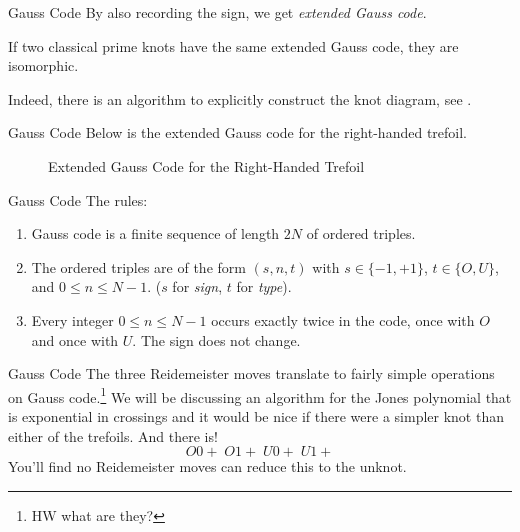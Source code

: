 \documentclass{beamer}
\begin{document}
    \begin{frame}{Gauss Code}
        By also recording the sign, we get \textit{extended Gauss code}.
        \begin{theorem}
            If two classical prime knots have the same extended Gauss code,
            they are isomorphic.
        \end{theorem}
        Indeed, there is an algorithm to explicitly construct the knot diagram,
        see \cite[p.~669]{KauffmanVirtualKnots1999}.
    \end{frame}
    \begin{frame}{Gauss Code}
        Below is the extended Gauss code for the right-handed trefoil.
        \begin{figure}
            \centering
            \caption{Extended Gauss Code for the Right-Handed Trefoil}
            \label{fig:right_hand_trefoil_extended_gauss}
        \end{figure}
    \end{frame}
    \begin{frame}{Gauss Code}
        The rules:
        \begin{enumerate}
            \item Gauss code is a finite sequence of length $2N$ of ordered
                  triples.
            \item The ordered triples are of the form $(s,n,t)$ with
                  $s\in\{-1,+1\}$, $t\in\{O,U\}$, and $0\leq{n}\leq{N-1}$.
                  ($s$ for \textit{sign}, $t$ for \textit{type}).
            \item Every integer $0\leq{n}\leq{N-1}$ occurs exactly twice in the
                  code, once with $O$ and once with $U$. The sign does not
                  change.
        \end{enumerate}
    \end{frame}
    \begin{frame}{Gauss Code}
        The three Reidemeister moves translate to fairly simple operations on
        Gauss code.\footnote{HW what are they?}
        We will be discussing an algorithm for the Jones polynomial that is
        exponential in crossings and it would be nice if there were a simpler
        knot than either of the trefoils. And there is!
        \begin{equation}
            O0+\;O1+\;U0+\;U1+
        \end{equation}
        You'll find no Reidemeister moves can reduce this to the unknot.
    \end{frame}
\end{document}
